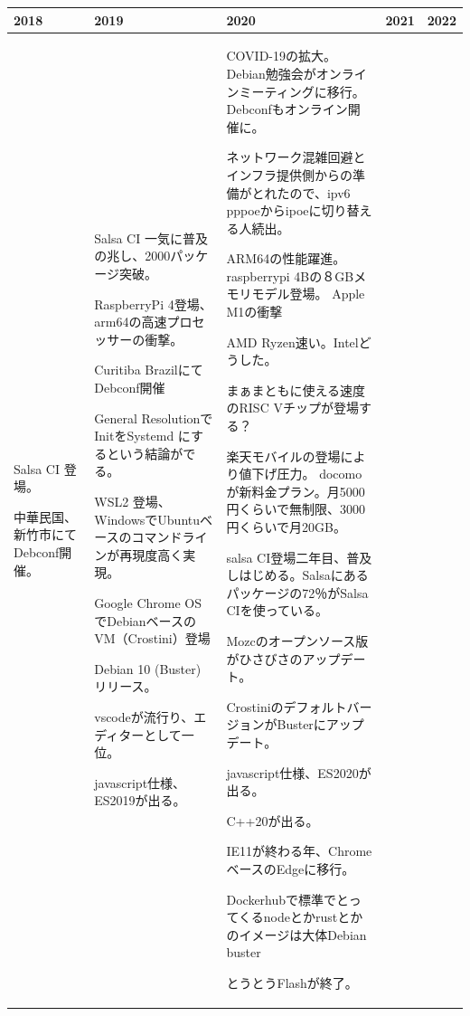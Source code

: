 \documentclass[mingoth,a4paper]{jsarticle}
\begin{document}
{\scriptsize

\begin{tabular}[t]{|p{8em}|p{8em}|p{8em}|p{8em}|p{8em}|}
\hline
2018 & 2019 & 2020 & 2021 & 2022 \\
\hline
Salsa CI 登場。

中華民国、新竹市にてDebconf開催。

&

Salsa CI 一気に普及の兆し、2000パッケージ突破。

RaspberryPi 4登場、arm64の高速プロセッサーの衝撃。

Curitiba BrazilにてDebconf開催

General ResolutionでInitをSystemd にするという結論がでる。

WSL2 登場、WindowsでUbuntuベースのコマンドラインが再現度高く実現。

Google Chrome OSでDebianベースのVM（Crostini）登場

Debian 10 (Buster) リリース。

vscodeが流行り、エディターとして一位。

javascript仕様、ES2019が出る。

&

COVID-19の拡大。Debian勉強会がオンラインミーティングに移行。Debconfもオンライン開催に。

ネットワーク混雑回避とインフラ提供側からの準備がとれたので、ipv6 pppoeからipoeに切り替える人続出。

ARM64の性能躍進。
raspberrypi 4Bの８GBメモリモデル登場。
Apple M1の衝撃

AMD Ryzen速い。Intelどうした。

まぁまともに使える速度のRISC Vチップが登場する？

楽天モバイルの登場により値下げ圧力。
docomoが新料金プラン。月5000円くらいで無制限、3000円くらいで月20GB。

salsa CI登場二年目、普及しはじめる。Salsaにあるパッケージの72％がSalsa CIを使っている。

Mozcのオープンソース版がひさびさのアップデート。

CrostiniのデフォルトバージョンがBusterにアップデート。

javascript仕様、ES2020が出る。

C++20が出る。

IE11が終わる年、ChromeベースのEdgeに移行。

Dockerhubで標準でとってくるnodeとかrustとかのイメージは大体Debian buster

とうとうFlashが終了。


\end{tabular}}
\end{document}
